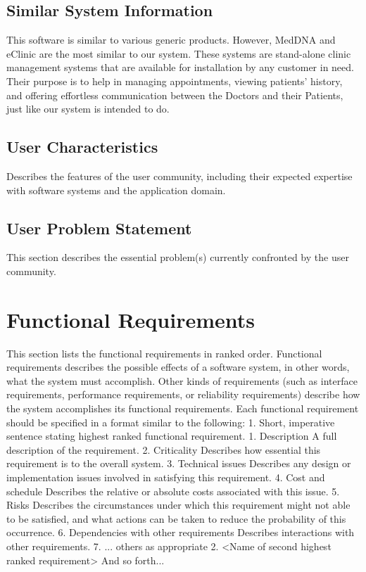 \documentclass[]{article}
\begin{document}
\subsection{Similar System Information}
This software is similar to various generic products. However, MedDNA and eClinic are the most similar to our system. These systems are stand-alone clinic management systems that are available for installation by any customer in need. Their purpose is to help in managing appointments, viewing patients' history, and offering effortless communication between the Doctors and their Patients, just like our system is intended to do.

\subsection{ User Characteristics}
Describes the features of the user community, including their expected expertise with software systems and the application domain. 

\subsection{ User Problem Statement}
This section describes the essential problem(s) currently confronted by the user community. 

\section{Functional Requirements}
This section lists the functional requirements in ranked order. Functional requirements describes the possible effects of a software system, in other words, what the system must accomplish. Other kinds of requirements (such as interface requirements, performance requirements, or reliability requirements) describe how the system accomplishes its functional requirements. Each functional requirement should be specified in a format similar to the following: 
1.	Short, imperative sentence stating highest ranked functional requirement.
1.	Description
A full description of the requirement. 
2.	Criticality
Describes how essential this requirement is to the overall system. 
3.	Technical issues
Describes any design or implementation issues involved in satisfying this requirement. 
4.	Cost and schedule
Describes the relative or absolute costs associated with this issue. 
5.	Risks
Describes the circumstances under which this requirement might not able to be satisfied, and what actions can be taken to reduce the probability of this occurrence. 
6.	Dependencies with other requirements
Describes interactions with other requirements. 
7.	... others as appropriate
2.	<Name of second highest ranked requirement>
And so forth... 
\end{document}
